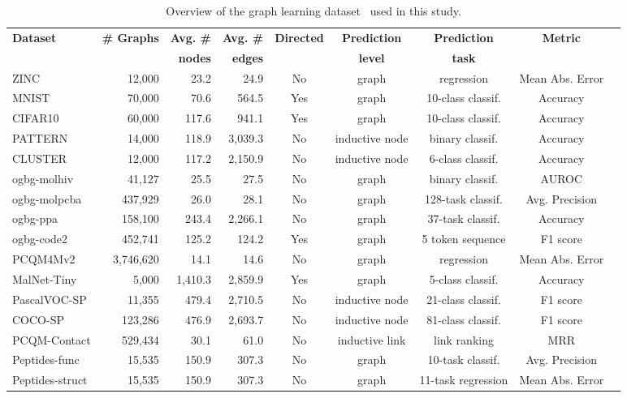 \documentclass{article}
\begin{document}
\begin{table}[h]
    \caption{Overview of the graph learning dataset~\cite{dwivedi2020benchmarking,hu2020ogb,hu2021ogblsc,freitas2021malnet,dwivedi2022LRGB} used in this study.}
    \label{tab:ds_summary}
    \begin{adjustwidth}{-2.5 cm}{-2.5 cm}
    \setlength\tabcolsep{4pt} \centering
    \footnotesize
    \begin{tabular}{lrrrccccc}\toprule
\multirow{2}{*}{\textbf{Dataset}} &\multirow{2}{*}{\textbf{\# Graphs}} &\textbf{Avg. \#} &\textbf{Avg. \#} &\multirow{2}{*}{\textbf{Directed}} &\textbf{Prediction} &\textbf{Prediction} &\multirow{2}{*}{\textbf{Metric}} \\
& &\textbf{nodes} &\textbf{edges} & &\textbf{level} &\textbf{task} & \\\midrule
    ZINC &12,000 &23.2 &24.9 &No &graph &regression &Mean Abs. Error \\
    MNIST &70,000 &70.6 &564.5 &Yes &graph &10-class classif. &Accuracy \\
    CIFAR10 &60,000 &117.6 &941.1 &Yes &graph &10-class classif. &Accuracy \\
    PATTERN &14,000 &118.9 &3,039.3 &No &inductive node &binary classif. &Accuracy \\
    CLUSTER &12,000 &117.2 &2,150.9 &No &inductive node &6-class classif. &Accuracy \\\midrule
    ogbg-molhiv &41,127 &25.5 &27.5 &No &graph &binary classif. &AUROC \\
    ogbg-molpcba &437,929 &26.0 &28.1 &No &graph &128-task classif. &Avg. Precision \\
    ogbg-ppa &158,100 &243.4 &2,266.1 &No &graph &37-task classif. &Accuracy \\
    ogbg-code2 &452,741 &125.2 &124.2 &Yes &graph &5 token sequence &F1 score \\
    PCQM4Mv2 &3,746,620 &14.1 &14.6 &No &graph &regression &Mean Abs. Error \\\midrule
    MalNet-Tiny &5,000 &1,410.3 &2,859.9 &Yes &graph &5-class classif. &Accuracy \\\midrule
    PascalVOC-SP & 11,355 & 479.4 & 2,710.5 & No &inductive node &21-class classif. &F1 score \\
    COCO-SP & 123,286 & 476.9 & 2,693.7 & No &inductive node &81-class classif. &F1 score \\
    PCQM-Contact & 529,434 & 30.1 & 61.0 & No &inductive link &link ranking &MRR \\
    Peptides-func & 15,535 & 150.9 & 307.3 & No &graph &10-task classif. &Avg. Precision \\
    Peptides-struct & 15,535 & 150.9 & 307.3 & No &graph &11-task regression &Mean Abs. Error \\
    \bottomrule
    \end{tabular}
\end{adjustwidth}\end{table}
\end{document}
